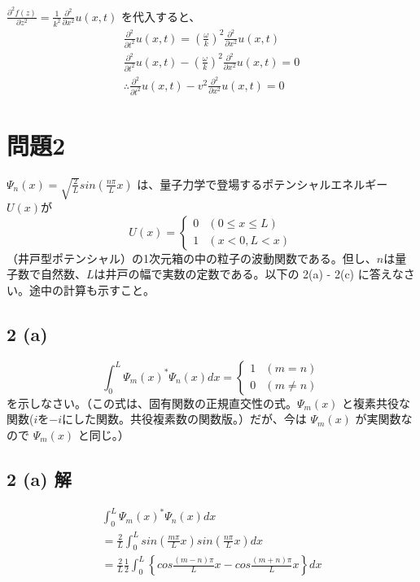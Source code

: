 \documentclass{jsarticle}
\begin{document}
$\frac{\partial^2 f(z)}{\partial z^2} = \frac{1}{k^2} \frac{\partial^2}{\partial x^2} u(x, t)$ を代入すると、
\begin{gather*}
\frac{\partial^2}{\partial t^2} u(x, t) = \left(\frac{\omega}{k} \right)^2 \frac{\partial^2}{\partial x^2} u(x, t) \\
\frac{\partial^2}{\partial t^2} u(x, t) - \left(\frac{\omega}{k} \right)^2 \frac{\partial^2}{\partial x^2} u(x, t) = 0 \\
\therefore \frac{\partial^2}{\partial t^2} u(x, t) - v^2 \frac{\partial^2}{\partial x^2} u(x, t) = 0
\end{gather*}

\section*{問題2}
$\Psi_n(x) = \sqrt{\frac{2}{L}} sin\left(\frac{n\pi}{L}x\right)$ は、量子力学で登場するポテンシャルエネルギー$U(x)$が
\[
U(x) = \left\{
\begin{array}{ll}
0 & (0 \leq x \leq L)\\
1 & (x < 0, L < x)
\end{array}
\right.
\]
（井戸型ポテンシャル）の1次元箱の中の粒子の波動関数である。但し、$n$は量子数で自然数、$L$は井戸の幅で実数の定数である。以下の 2(a) - 2(c) に答えなさい。途中の計算も示すこと。

\subsection*{2 (a)}
\[
\int_0^L\Psi_m(x)^* \Psi_n(x) dx = \left\{
\begin{array}{ll}
1 & (m = n)\\
0 & (m \neq n)
\end{array}
\right.
\]
を示しなさい。（この式は、固有関数の正規直交性の式。$\Psi_m(x)$ と複素共役な関数($i$を$-i$にした関数。共役複素数の関数版。）だが、今は $\Psi_m(x)$ が実関数なので $\Psi_m(x)$ と同じ。）

\subsection*{2 (a) 解}
\begin{gather*}
\int_0^L \Psi_m (x)^* \Psi_n (x) dx \\
= \frac{2}{L} \int_0^L sin \left(\frac{m\pi}{L}x \right) sin \left(\frac{n\pi}{L}x \right) dx \\
= \frac{2}{L} \frac{1}{2}
\int_0^L \left\{ cos\frac{(m-n)\pi}{L}x
- cos\frac{(m+n)\pi}{L}x \right\} dx \tag{1}\label{2a1}
\end{gather*}
\end{document}
